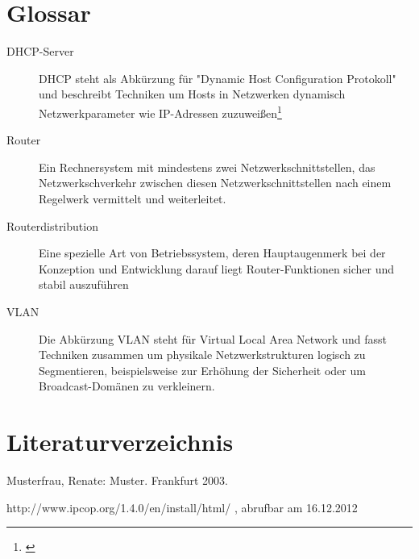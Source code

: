 \documentclass[a4paper,12pt]{scrartcl}
\begin{document}
\clearpage

\section{Glossar}
\begin{description}
 \item[DHCP-Server] DHCP steht als Abk\"urzung f\"ur "Dynamic Host
Configuration Protokoll" und beschreibt Techniken um Hosts in Netzwerken
dynamisch Netzwerkparameter wie IP-Adressen zuzuwei\ss{}en\footnote{\cite{dhcp}}
 \item[Router] Ein Rechnersystem mit mindestens zwei Netzwerkschnittstellen,
das Netzwerkschverkehr zwischen diesen Netzwerkschnittstellen nach einem
Regelwerk vermittelt und weiterleitet.
 \item[Routerdistribution] Eine spezielle Art von Betriebssystem, deren
Hauptaugenmerk bei der Konzeption und Entwicklung darauf liegt
Router-Funktionen sicher und stabil auszuf\"uhren
 \item[VLAN] Die Abk\"urzung VLAN steht f\"ur Virtual Local Area Network und
fasst Techniken zusammen um physikale Netzwerkstrukturen logisch zu
Segmentieren, beispielsweise zur Erh\"ohung der Sicherheit oder um
Broadcast-Dom\"anen zu verkleinern.
\end{description}
\clearpage

\section{Literaturverzeichnis}

Musterfrau, Renate: Muster. Frankfurt 2003.


\begin{thebibliography}{99}

 http://www.ipcop.org/1.4.0/en/install/html/ , abrufbar am
16.12.2012

\end{thebibliography}
\end{document}
